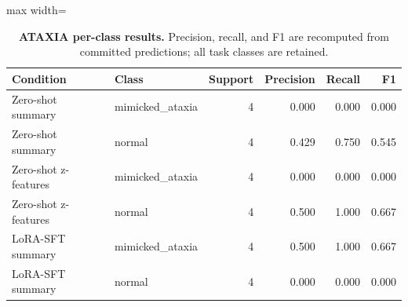 \begin{table}[H]
\centering
\caption{\textbf{ATAXIA per-class results.} Precision, recall, and F1 are recomputed from committed predictions; all task classes are retained.}
\label{tab:per_class_ataxia}
\small
\begin{adjustbox}{max width=\textwidth}
\begin{tabular}{llrrrr}
\toprule
Condition & Class & Support & Precision & Recall & F1 \\
\midrule
Zero-shot summary & mimicked\_ataxia & 4 & 0.000 & 0.000 & 0.000 \\
Zero-shot summary & normal & 4 & 0.429 & 0.750 & 0.545 \\
Zero-shot z-features & mimicked\_ataxia & 4 & 0.000 & 0.000 & 0.000 \\
Zero-shot z-features & normal & 4 & 0.500 & 1.000 & 0.667 \\
LoRA-SFT summary & mimicked\_ataxia & 4 & 0.500 & 1.000 & 0.667 \\
LoRA-SFT summary & normal & 4 & 0.000 & 0.000 & 0.000 \\
\bottomrule
\end{tabular}
\end{adjustbox}
\end{table}
